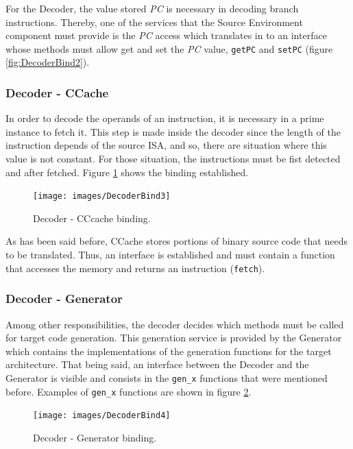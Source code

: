 \documentclass[12pt]{article}
\begin{document}
{    For the Decoder, the value stored \textit{PC} is necessary in decoding branch instructions. Thereby, one of the services that the Source Environment component must provide is the \textit{PC} access which translates in to an interface whose methods must allow get and set the \textit{PC} value, \texttt{getPC} and \texttt{setPC} (figure \ref{fig:DecoderBind2}). 
     
    \subsubsection*{Decoder - CCache}
    In order to decode the operands of an instruction, it is necessary in a prime instance to fetch it. This step is made inside the decoder since the length of the instruction depends of the source ISA, and so, there are situation where this value is not constant. For those situation, the instructions must be fist detected and after fetched. Figure \ref{fig:DecoderBind3} shows the binding established.
    
    \begin{figure}[!htb]
    \centerline{
    \texttt{[image: images/DecoderBind3]}
    }
    \caption{Decoder - CCcache binding.}
    \label{fig:DecoderBind3} 
    \end{figure}
    
    As has been said before, CCache stores portions of binary source code that needs to be translated. Thus, an interface is established and must contain a function that accesses the memory and returns an instruction (\texttt{fetch}). 
       
    \subsubsection{Decoder - Generator}
    
    Among other responsibilities, the decoder decides which methods must be called for target code generation. This generation service is provided by the Generator which contains the implementations of the generation functions for the target architecture.
	That being said, an interface between the Decoder and the Generator is visible and consists in the \texttt{gen\_x} functions that were mentioned before. Examples of \texttt{gen\_x} functions are shown in figure \ref{fig:DecoderBind4}.
    
    \begin{figure}[!htb]
    \centerline{
    \texttt{[image: images/DecoderBind4]}
    }
    \caption{Decoder - Generator binding.}
    \label{fig:DecoderBind4} 
    \end{figure}
    
}
\end{document}
